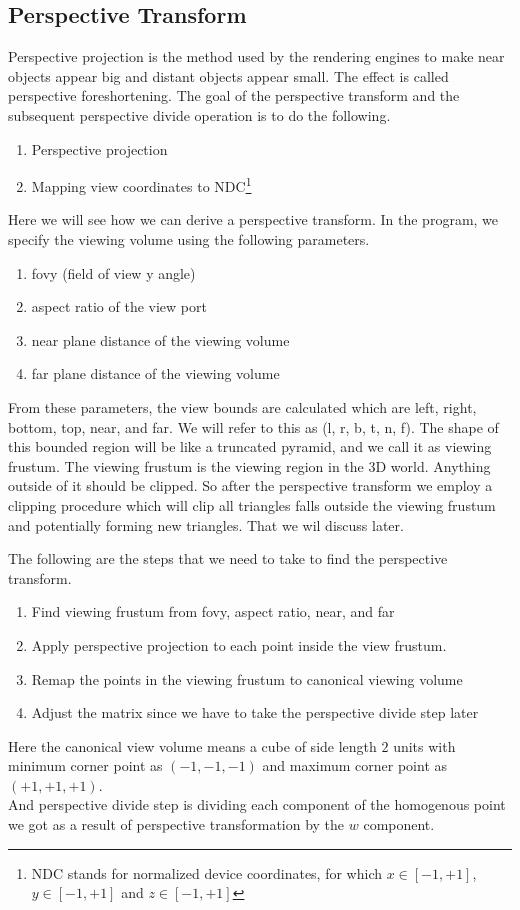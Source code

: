 \subsection{Perspective Transform}
Perspective projection is the method used by the rendering engines to make near objects appear big and distant objects appear small. The effect is called perspective foreshortening. The goal of the perspective transform and the subsequent perspective divide operation is to do the following.
\begin{enumerate}
\item Perspective projection
\item Mapping view coordinates to NDC\footnote{NDC stands for normalized device coordinates, for which $x \in [-1,+1]$, $y \in [-1,+1]$ and $z \in [-1,+1]$}
\end{enumerate}
Here we will see how we can derive a perspective transform.
In the program, we specify the viewing volume using the following parameters.
\begin{enumerate}
    \item fovy (field of view y angle)
    \item aspect ratio of the view port
    \item near plane distance of the viewing volume
    \item far plane distance of the viewing volume
\end{enumerate}
From these parameters, the view bounds are calculated which are left, right, bottom, top, near, and far. We will refer to this as (l, r, b, t, n, f). The shape of this bounded region will be like a truncated pyramid, and we call it as viewing frustum. The viewing frustum is the viewing region in the 3D world. Anything outside of it should be clipped. So after the perspective transform we employ a clipping procedure which will clip all triangles falls outside the viewing frustum and potentially forming new triangles.
That we wil discuss later.

The following are the steps that we need to take to find the perspective transform.
\vspace{1em}
\begin{enumerate}
    \item Find viewing frustum from fovy, aspect ratio, near, and far
    \item Apply perspective projection to each point inside the view frustum.
    \item Remap the points in the viewing frustum to canonical viewing volume
    \item Adjust the matrix since we have to take the perspective divide step later
\end{enumerate}
Here the canonical view volume means a cube of side length $2$ units with minimum corner point as $(-1, -1, -1)$ and maximum corner point as $(+1, +1, +1)$. \\
And perspective divide step is dividing each component of the homogenous point we got as a result of  perspective transformation by the $w$ component.\\

